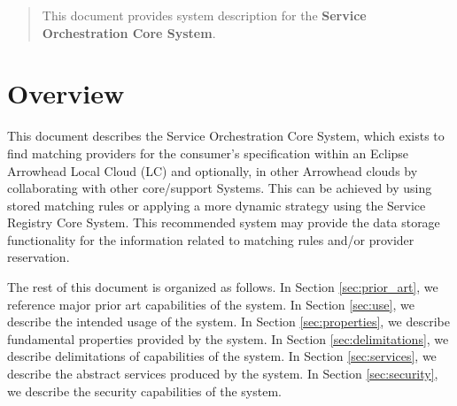 \documentclass[a4paper]{arrowhead}
\begin{document}
\ArrowheadDate{\today}
\ArrowheadSetup

\begin{center}
  \vspace*{1cm}
  \huge{\arrowtitle}

  \vspace*{0.2cm}
  \LARGE{\arrowtype}
  \vspace*{1cm}

  \vspace*{\fill}


  \vspace*{1cm}
  \vspace*{\fill}

  \begin{abstract}
    This document provides system description for the \textbf{Service Orchestration Core System}.
  \end{abstract}

  \vspace*{1cm}

 \end{center}

\newpage

\tableofcontents
\newpage

\section{Overview}
\label{sec:overview}
\color{black}
This document describes the Service Orchestration Core System, which exists to find matching providers for the consumer's specification within an Eclipse Arrowhead Local Cloud (LC) and optionally, in other Arrowhead clouds by collaborating with other core/support Systems. This can be achieved by using stored matching rules or applying a more dynamic strategy using the Service Registry Core System. This recommended system may provide the data storage functionality for the information related to matching rules and/or provider reservation.

The rest of this document is organized as follows.
In Section \ref{sec:prior_art}, we reference major prior art capabilities
of the system.
In Section \ref{sec:use}, we describe the intended usage of the system.
In Section \ref{sec:properties}, we describe fundamental properties
provided by the system.
In Section \ref{sec:delimitations}, we describe delimitations of capabilities
of the system.
In Section \ref{sec:services}, we describe the abstract services produced by the system.
In Section \ref{sec:security}, we describe the security capabilities
of the system.
\end{document}
